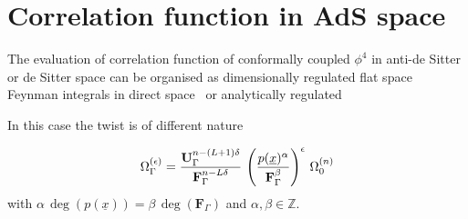 \documentclass[a4paper,12pt]{article}
\numberwithin{equation}{section}
\numberwithin{figure}{section}
\begin{document}
\section{Correlation function in AdS space}

The evaluation of correlation function of conformally coupled $\phi^4$  in anti-de Sitter or de Sitter
space can be organised as dimensionally regulated flat space Feynman integrals in direct
space~\cite{Heckelbacher:2022fbx,Heckelbacher:2022hbq} or
analytically regulated 


In this case the twist is of different nature

\begin{equation}
  \Omega_\Gamma^{(\epsilon)} =
  {\textbf{U}_\Gamma^{n-(L+1)\delta}\over\textbf{F}_\Gamma^{n-L\delta}}\,
    \left(p(\underline x)^\alpha\over \textbf{F}_\Gamma^\beta\right)^\epsilon\,\Omega^{(n)}_0
\end{equation}
with $\alpha\,\deg(p(\underline x)) = \beta\,\deg(\textbf{F}_\Gamma)$ and
$\alpha,\beta\in\mathbb Z$.
\end{document}
